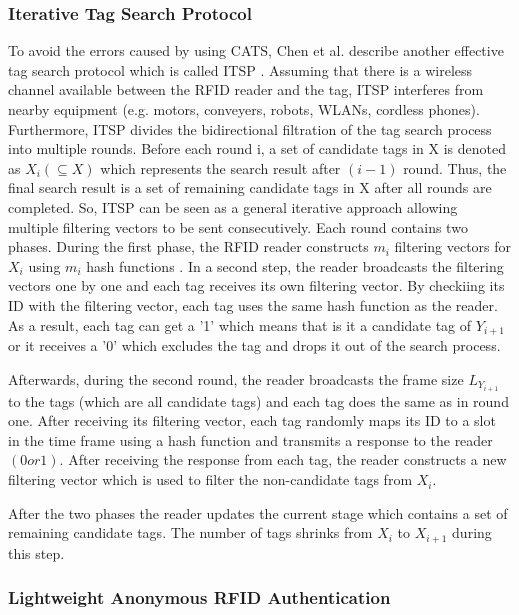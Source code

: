 \subsubsection{Iterative Tag Search Protocol}

To avoid the errors caused by using CATS, Chen et al. describe another effective tag search protocol which is called \ac{ITSP} \cite[p.22-28]{chen}. Assuming that there is a wireless channel available between the RFID reader and the tag, ITSP interferes from nearby equipment (e.g. motors, conveyers, robots, WLANs, cordless phones). Furthermore, ITSP divides the bidirectional filtration of the tag search process into multiple rounds. Before each round i, a set of candidate tags in X is denoted as $X_{i}(\subseteq X)$ which represents the search result after $(i-1)$ round. Thus, the final search result is a set of remaining candidate tags in X after all rounds are completed. So, ITSP can be seen as a general iterative approach allowing multiple filtering vectors to be sent consecutively. Each round contains two phases. During the first phase, the RFID reader constructs $m_{i}$ filtering vectors for $X_{i}$ using $m_{i}$ hash functions \cite[p.22]{chen}. In a second step, the reader broadcasts the filtering vectors one by one and each tag receives its own filtering vector. By checkiing its ID with the filtering vector, each tag uses the same hash function as the reader. As a result, each tag can get a '1' which means that is it a candidate tag of $Y_{i+1}$  or it receives a '0' which excludes the tag and drops it out of the search process.

Afterwards, during the second round, the reader broadcasts the frame size $L_{Y_{i+1}}$ to the tags (which are all candidate tags) and each tag does the same as in round one. After receiving its filtering vector, each tag randomly maps its ID to a slot in the time frame using a hash function and transmits a response to the reader $(0 or 1)$. After receiving the response from each tag, the reader constructs a new filtering vector which is used to filter the non-candidate tags from $X_{i}$.

After the two phases the reader updates the current stage which contains a set of remaining candidate tags. The number of tags shrinks from $X_{i}$ to $X_{i+1}$ during this step. 

\subsubsection{Lightweight Anonymous RFID Authentication}

